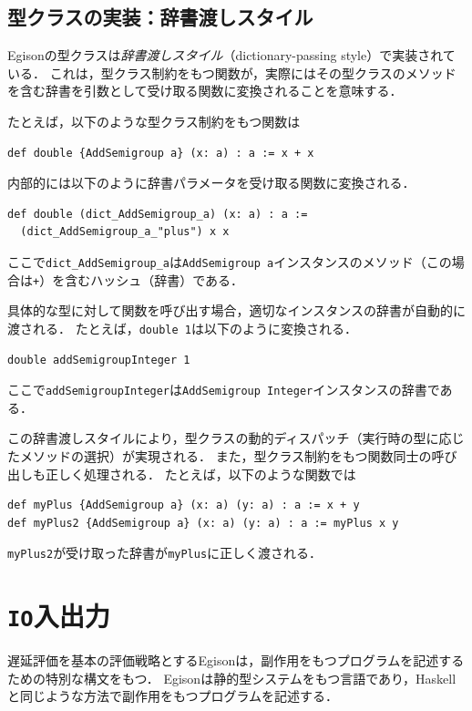 \subsection{型クラスの実装：辞書渡しスタイル}

Egisonの型クラスは\emph{辞書渡しスタイル}（dictionary-passing style）で実装されている．
これは，型クラス制約をもつ関数が，実際にはその型クラスのメソッドを含む辞書を引数として受け取る関数に変換されることを意味する．

たとえば，以下のような型クラス制約をもつ関数は
\begin{lstlisting}[language=egison,numbers=none]
def double {AddSemigroup a} (x: a) : a := x + x
\end{lstlisting}
内部的には以下のように辞書パラメータを受け取る関数に変換される．
\begin{lstlisting}[language=egison,numbers=none]
def double (dict_AddSemigroup_a) (x: a) : a :=
  (dict_AddSemigroup_a_"plus") x x
\end{lstlisting}
ここで\lstinline{dict_AddSemigroup_a}は\lstinline{AddSemigroup a}インスタンスのメソッド（この場合は\lstinline{+}）を含むハッシュ（辞書）である．

具体的な型に対して関数を呼び出す場合，適切なインスタンスの辞書が自動的に渡される．
たとえば，\lstinline{double 1}は以下のように変換される．
\begin{lstlisting}[language=egison,numbers=none]
double addSemigroupInteger 1
\end{lstlisting}
ここで\lstinline{addSemigroupInteger}は\lstinline{AddSemigroup Integer}インスタンスの辞書である．

この辞書渡しスタイルにより，型クラスの動的ディスパッチ（実行時の型に応じたメソッドの選択）が実現される．
また，型クラス制約をもつ関数同士の呼び出しも正しく処理される．
たとえば，以下のような関数では
\begin{lstlisting}[language=egison,numbers=none]
def myPlus {AddSemigroup a} (x: a) (y: a) : a := x + y
def myPlus2 {AddSemigroup a} (x: a) (y: a) : a := myPlus x y
\end{lstlisting}
\lstinline{myPlus2}が受け取った辞書が\lstinline{myPlus}に正しく渡される．

\section{\texttt{IO}入出力}

遅延評価を基本の評価戦略とするEgisonは，副作用をもつプログラムを記述するための特別な構文をもつ．
Egisonは静的型システムをもつ言語であり，Haskellと同じような方法で副作用をもつプログラムを記述する．

